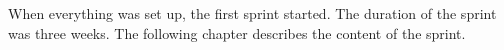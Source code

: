 When everything was set up, the first sprint started. The duration of the sprint was three weeks. The following chapter describes the content of the sprint. 